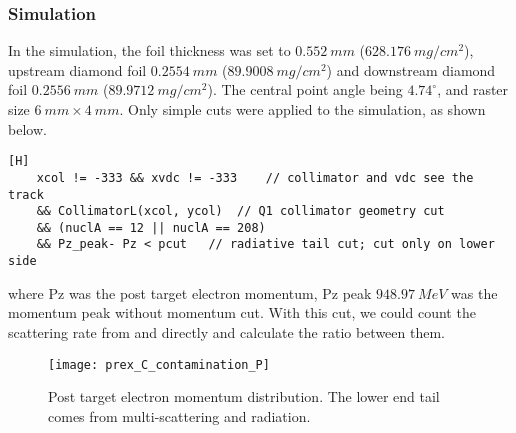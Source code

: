 \subsubsection{Simulation}
In the simulation, the \Pb foil thickness was set to $0.552\ mm$ ($628.176\ mg/cm^2$), 
upstream diamond foil $0.2554\ mm$ ($89.9008\ mg/cm^2$) and downstream diamond 
foil $0.2556\ mm$ ($89.9712\ mg/cm^2$). The central point angle being $4.74^\circ$,
and raster size $6\ mm \times 4\ mm$. 
Only simple cuts were applied to the simulation, as shown below.

\begin{lstlisting}[float,style=C][H]
    xcol != -333 && xvdc != -333    // collimator and vdc see the track
    && CollimatorL(xcol, ycol)	// Q1 collimator geometry cut
    && (nuclA == 12 || nuclA == 208)
    && Pz_peak- Pz < pcut	// radiative tail cut; cut only on lower side
\end{lstlisting}
where Pz was the post target electron momentum, Pz peak $948.97\ MeV$ 
was the momentum peak without momentum cut. With this cut, we could count the scattering
rate from \C and \Pb directly and calculate the ratio between them.

\begin{figure}[H]
    \centering
    \texttt{[image: prex\_C\_contamination\_P]}
    \caption{Post target electron momentum distribution. The lower end tail comes 
    from multi-scattering and radiation.}
\end{figure}

